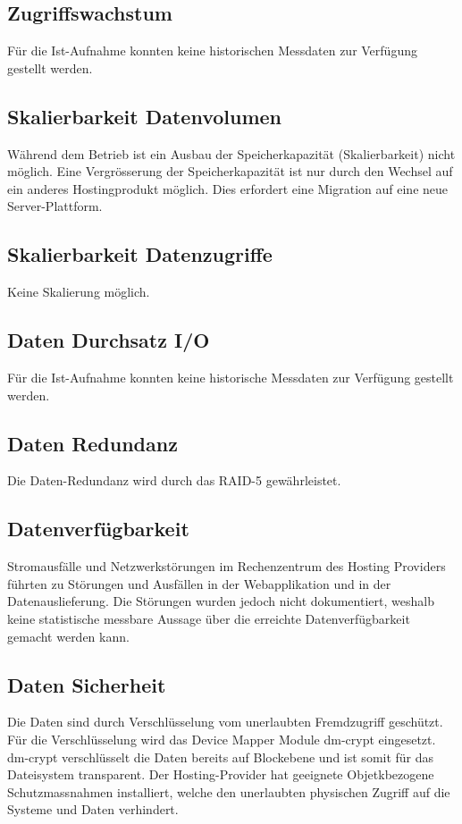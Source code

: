 \subsection{Zugriffswachstum}
Für die Ist-Aufnahme konnten keine historischen Messdaten zur Verfügung gestellt werden.

\subsection{Skalierbarkeit Datenvolumen}
Während dem Betrieb ist ein Ausbau der Speicherkapazität (Skalierbarkeit) nicht möglich. Eine Vergrösserung der Speicherkapazität ist nur durch den Wechsel auf ein anderes Hostingprodukt möglich. Dies erfordert eine Migration auf eine neue Server-Plattform. 

\subsection{Skalierbarkeit Datenzugriffe}
Keine Skalierung möglich. 

\subsection{Daten Durchsatz I/O}
Für die Ist-Aufnahme konnten keine historische Messdaten zur Verfügung gestellt werden.

\subsection{Daten Redundanz}

Die Daten-Redundanz wird durch das RAID-5 gewährleistet.

\subsection{Datenverfügbarkeit}
Stromausfälle und Netzwerkstörungen im Rechenzentrum des \gls{Hosting} \gls{Provider}s führten zu Störungen und Ausfällen in der Webapplikation und in der Datenauslieferung. Die Störungen wurden jedoch nicht dokumentiert, weshalb keine statistische messbare Aussage über die erreichte Datenverfügbarkeit gemacht werden kann.

\subsection{Daten Sicherheit}
Die Daten sind durch Verschlüsselung vom unerlaubten Fremdzugriff geschützt. Für die Verschlüsselung wird das Device Mapper Module dm-crypt eingesetzt. dm-crypt verschlüsselt die Daten bereits auf Blockebene und ist somit für das Dateisystem transparent.
Der Hosting-Provider hat geeignete Objetkbezogene Schutzmassnahmen installiert, welche den unerlaubten physischen Zugriff auf die Systeme und Daten verhindert.

